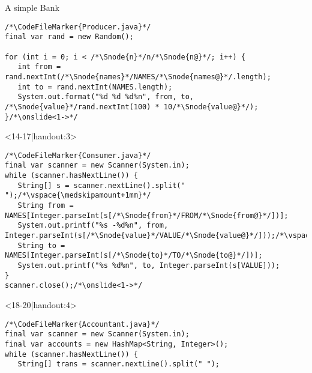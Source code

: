 \begin{frame}[fragile]{A simple Bank}
\begin{onlyenv}
\begin{layout-imageonly}
\begin{onlyenv}
\begin{verbatim}
/*\CodeFileMarker{Producer.java}*/
final var rand = new Random();

for (int i = 0; i < /*\Snode{n}*/n/*\Snode{n@}*/; i++) {
   int from = rand.nextInt(/*\Snode{names}*/NAMES/*\Snode{names@}*/.length);
   int to = rand.nextInt(NAMES.length);
   System.out.format("%d %d %d%n", from, to, /*\Snode{value}*/rand.nextInt(100) * 10/*\Snode{value@}*/);
}/*\onslide<1->*/
\end{verbatim}
\end{onlyenv}
\begin{onlyenv}<14-17|handout:3>
\begin{verbatim}
/*\CodeFileMarker{Consumer.java}*/
final var scanner = new Scanner(System.in);
while (scanner.hasNextLine()) {
   String[] s = scanner.nextLine().split(" ");/*\vspace{\medskipamount+1mm}*/
   String from = NAMES[Integer.parseInt(s[/*\Snode{from}*/FROM/*\Snode{from@}*/])];
   System.out.printf("%s -%d%n", from, Integer.parseInt(s[/*\Snode{value}*/VALUE/*\Snode{value@}*/]));/*\vspace{\medskipamount+1mm}*/
   String to = NAMES[Integer.parseInt(s[/*\Snode{to}*/TO/*\Snode{to@}*/])];
   System.out.printf("%s %d%n", to, Integer.parseInt(s[VALUE]));
}
scanner.close();/*\onslide<1->*/
\end{verbatim}
\end{onlyenv}
\begin{onlyenv}<18-20|handout:4>
\begin{verbatim}
/*\CodeFileMarker{Accountant.java}*/
final var scanner = new Scanner(System.in);
final var accounts = new HashMap<String, Integer>();
while (scanner.hasNextLine()) {
   String[] trans = scanner.nextLine().split(" ");


\end{verbatim}
\end{onlyenv}
\end{layout-imageonly}
\end{onlyenv}
\end{frame}
